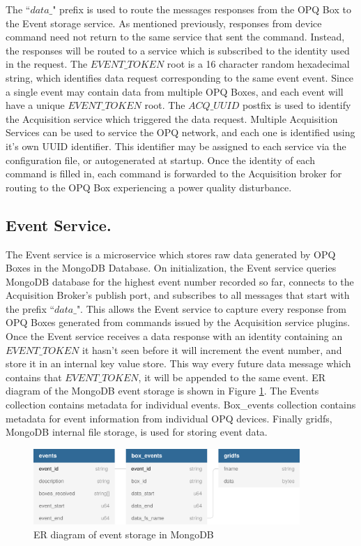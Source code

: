 The ``$data\_$" prefix is used to route the messages responses from the OPQ Box to the Event storage service.
As mentioned previously, responses from device command need not return to the same service that sent the command.
Instead, the responses will be routed to a service which is subscribed to the identity used in the request.
The $EVENT\_TOKEN$ root is a 16 character random hexadecimal string, which identifies data request corresponding to the same event event.
Since a single event may contain data from multiple OPQ Boxes, and each event will have a unique $EVENT\_TOKEN$ root.
The $ACQ\_UUID$ postfix is used to identify the Acquisition service which triggered the data request.
Multiple Acquisition Services can be used to service the OPQ network, and each one is identified using it's own UUID identifier.
This identifier may be assigned to each service via the configuration file, or autogenerated at startup.
Once the identity of each command is filled in, each command is forwarded to the Acquisition broker for routing to the OPQ Box experiencing a power quality disturbance.

\subsection{Event Service.}\label{subsec:event-service}

The Event service is a microservice which stores raw data generated by OPQ Boxes in the MongoDB Database.
On initialization, the Event service queries MongoDB database for the highest event number recorded so far, connects to the Acquisition Broker's publish port,
and subscribes to all messages that start with the prefix ``$data\_$".
This allows the Event service to capture every response from OPQ Boxes generated from commands issued by the Acquisition service plugins.
Once the Event service receives a data response with an identity containing an $EVENT\_TOKEN$ it hasn't seen before it will increment the event number, and
store it in an internal key value store.
This way every future data message which contains that $EVENT\_TOKEN$, it will be appended to the same event.
ER diagram of the MongoDB event storage is shown in Figure \ref{fig:opq:mongo_er}.
The Events collection contains metadata for individual events.
Box\_events collection contains metadata for event information from individual OPQ devices.
Finally gridfs, MongoDB internal file storage, is used for storing event data.

\begin{figure}[h]
	\begin{center}
		\includegraphics[width=0.9\textwidth]{img/mongo_event_storage.pdf}
	\end{center}
	\caption{ER diagram of event storage in MongoDB}
	\label{fig:opq:mongo_er}
\end{figure}

